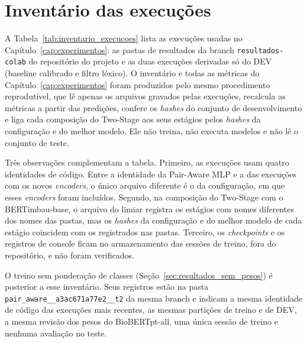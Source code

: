 \chapter[Inventário das execuções]{Inventário das execuções}
\label{ap:inventario}

A Tabela~\ref{tab:inventario_execucoes} lista as execuções usadas no
Capítulo~\ref{cap:experimentos}: as pastas de resultados da branch
\texttt{resultados-colab} do repositório do projeto e as duas execuções derivadas só do
DEV (baseline calibrado e filtro léxico). O inventário e todas as métricas do
Capítulo~\ref{cap:experimentos} foram produzidos pelo mesmo procedimento
reprodutível, que lê apenas os arquivos gravados pelas execuções, recalcula as
métricas a partir das predições, confere os \emph{hashes} do conjunto de
desenvolvimento e liga cada composição do Two-Stage aos seus estágios pelos
\emph{hashes} da configuração e do melhor modelo. Ele não treina, não executa modelos
e não lê o conjunto de teste.

Três observações complementam a tabela. Primeiro, as execuções usam quatro
identidades de código. Entre a identidade da Pair-Aware MLP e a das execuções com os
novos \emph{encoders}, o único arquivo diferente é o da configuração, em que esses
\emph{encoders} foram incluídos. Segundo, na composição
do Two-Stage com o BERTimbau-base, o arquivo do limiar registra os estágios com nomes
diferentes dos nomes das pastas, mas os \emph{hashes} da configuração e do melhor
modelo de cada estágio coincidem com os registrados nas pastas. Terceiro, os
\emph{checkpoints} e os registros de console ficam no armazenamento das sessões de
treino, fora do repositório, e não foram verificados.

O treino sem ponderação de classes (Seção~\ref{sec:resultados_sem_pesos}) é
posterior a esse inventário. Seus registros estão na pasta
\texttt{pair\_aware\_\_a3ac671a77e2\_\_t2} da mesma branch e indicam a mesma
identidade de código das execuções mais recentes, as mesmas partições de treino e de
DEV, a mesma revisão dos pesos do BioBERTpt-all, uma única sessão de treino e nenhuma
avaliação no teste.


